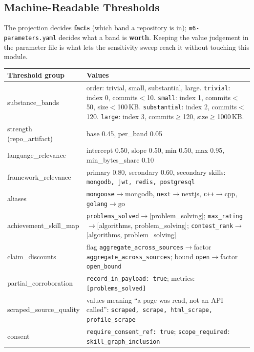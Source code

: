 \documentclass[10pt,a4paper]{article}
\begin{document}
\subsection{Machine-Readable Thresholds}

The projection decides \textbf{facts} (which band a repository is in);
\texttt{m6-parameters.yaml} decides what a band is \textbf{worth}. Keeping
the value judgement in the parameter file is what lets the sensitivity
sweep reach it without touching this module.

\begin{center}\small
\begin{tabular}{@{}L{3.0cm}L{9.8cm}@{}}
\toprule
\textbf{Threshold group} & \textbf{Values} \\
\midrule
substance\_bands & order: trivial, small, substantial, large. \texttt{trivial}: index 0, commits$<$10. \texttt{small}: index 1, commits$<$50, size$<$100\,KB. \texttt{substantial}: index 2, commits$<$120. \texttt{large}: index 3, commits$\geq$120, size$\geq$1000\,KB. \\
strength (repo\_artifact) & base 0.45, per\_band 0.05 \\
language\_relevance & intercept 0.50, slope 0.50, min 0.50, max 0.95, min\_bytes\_share 0.10 \\
framework\_relevance & primary 0.80, secondary 0.60, secondary skills: \texttt{mongodb, jwt, redis, postgresql} \\
aliases & \texttt{mongoose}$\to$mongodb, \texttt{next}$\to$nextjs, \texttt{c++}$\to$cpp, \texttt{golang}$\to$go \\
achievement\_skill\_map & \texttt{problems\_solved}$\to$[problem\_solving]; \texttt{max\_rating}$\to$[algorithms, problem\_solving]; \texttt{contest\_rank}$\to$[algorithms, problem\_solving] \\
claim\_discounts & flag \texttt{aggregate\_across\_sources}$\to$factor \texttt{aggregate\_across\_sources}; bound \texttt{open}$\to$factor \texttt{open\_bound} \\
partial\_corroboration & \texttt{record\_in\_payload: true}; metrics: \texttt{[problems\_solved]} \\
scraped\_source\_quality & values meaning ``a page was read, not an API called'': \texttt{scraped, scrape, html\_scrape, profile\_scrape} \\
consent & \texttt{require\_consent\_ref: true}; \texttt{scope\_required: skill\_graph\_inclusion} \\
\bottomrule
\end{tabular}
\end{center}
\end{document}
